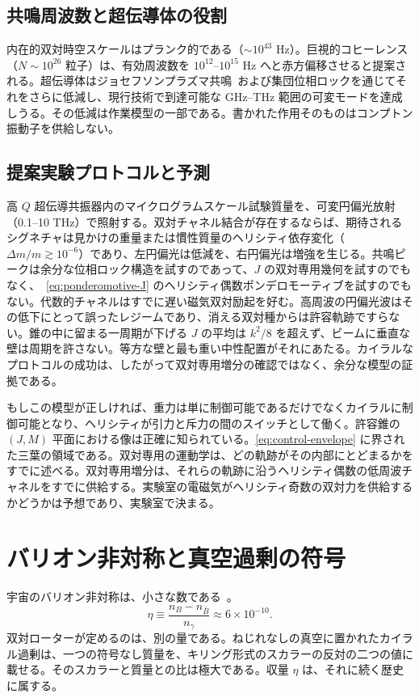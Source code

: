 \documentclass[a4paper]{article}
\begin{document}
\subsection{共鳴周波数と超伝導体の役割}

内在的双対時空スケールはプランク的である（$\sim 10^{43}$ Hz）。巨視的コヒーレンス（$N \sim 10^{26}$ 粒子）は、有効周波数を $10^{12}$--$10^{15}$ Hz へと赤方偏移させると提案される。超伝導体はジョセフソンプラズマ共鳴~\cite{josephson1962}および集団位相ロックを通じてそれをさらに低減し、現行技術で到達可能な GHz--THz 範囲の可変モードを達成しうる。その低減は作業模型の一部である。書かれた作用そのものはコンプトン振動子を供給しない。

\subsection{提案実験プロトコルと予測}

高 $Q$ 超伝導共振器内のマイクログラムスケール試験質量を、可変円偏光放射（0.1--10 THz）で照射する。双対チャネル結合が存在するならば、期待されるシグネチャは見かけの重量または慣性質量のヘリシティ依存変化（$\Delta m/m \gtrsim 10^{-6}$）であり、左円偏光は低減を、右円偏光は増強を生じる。共鳴ピークは余分な位相ロック構造を試すのであって、$J$ の双対専用幾何を試すのでもなく、~\eqref{eq:ponderomotive-J} のヘリシティ偶数ポンデロモーティブを試すのでもない。代数的チャネルはすでに遅い磁気双対励起を好む。高周波の円偏光波はその低下にとって誤ったレジームであり、消える双対種からは許容軌跡ですらない。錐の中に留まる一周期が下げる $J$ の平均は $k^2/8$ を超えず、ビームに垂直な壁は周期を許さない。等方な壁と最も重い中性配置がそれにあたる。カイラルなプロトコルの成功は、したがって双対専用増分の確認ではなく、余分な模型の証拠である。

もしこの模型が正しければ、重力は単に制御可能であるだけでなくカイラルに制御可能となり、ヘリシティが引力と斥力の間のスイッチとして働く。許容錐の $(J,M)$ 平面における像は正確に知られている。\eqref{eq:control-envelope} に界された三葉の領域である。双対専用の運動学は、どの軌跡がその内部にとどまるかをすでに述べる。双対専用増分は、それらの軌跡に沿うヘリシティ偶数の低周波チャネルをすでに供給する。実験室の電磁気がヘリシティ奇数の双対力を供給するかどうかは予想であり、実験室で決まる。

\section{バリオン非対称と真空過剰の符号}
\label{sec:baryonasymmetry}

宇宙のバリオン非対称は、小さな数である~\cite{planck2018}。
\[
\eta \equiv \frac{n_B-n_{\bar B}}{n_\gamma}\approx 6\times 10^{-10}.
\]
双対ローターが定めるのは、別の量である。ねじれなしの真空に置かれたカイラル過剰は、一つの符号なし質量を、キリング形式のスカラーの反対の二つの値に載せる。そのスカラーと質量との比は極大である。収量 $\eta$ は、それに続く歴史に属する。
\end{document}
